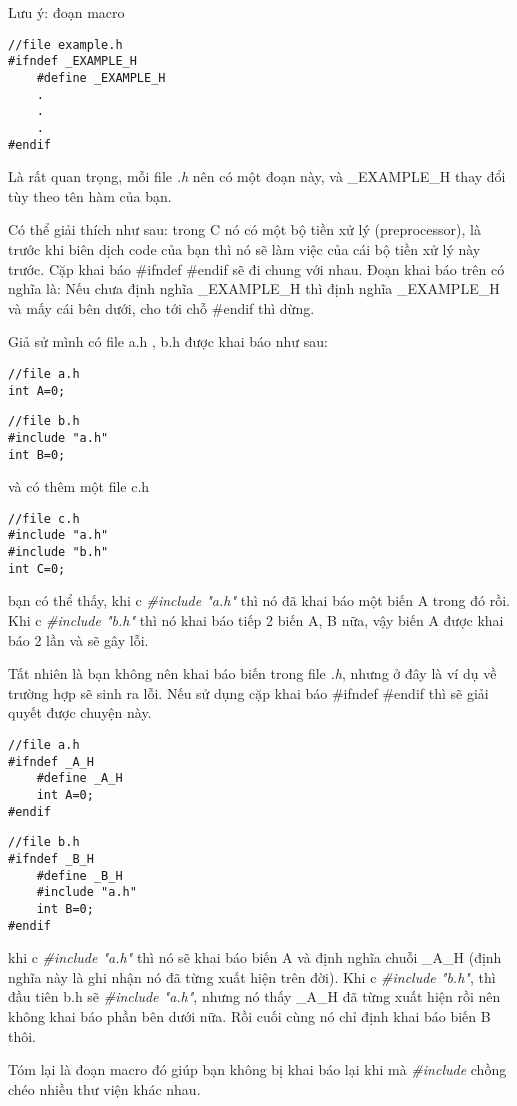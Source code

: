 Lưu ý: đoạn macro
\begin{lstlisting}
//file example.h
#ifndef _EXAMPLE_H
	#define _EXAMPLE_H
	.
	.
	.
#endif
\end{lstlisting}
Là rất quan trọng, mỗi file \textit{.h} nên có một đoạn này, và \_EXAMPLE\_H thay đổi tùy theo tên hàm của bạn.

Có thể giải thích như sau: trong C nó có một bộ tiền xử lý (preprocessor), là trước khi biên dịch code của bạn thì nó sẽ làm việc của cái bộ tiền xử lý này trước. Cặp khai báo \#ifndef \#endif sẽ đi chung với nhau. Đoạn khai báo trên có nghĩa là: Nếu chưa định nghĩa \_EXAMPLE\_H thì định nghĩa \_EXAMPLE\_H và mấy cái bên dưới, cho tới chỗ \#endif thì dừng.

Giả sử mình có file a.h , b.h được khai báo như sau:

\begin{lstlisting}
//file a.h
int A=0;
\end{lstlisting}
\begin{lstlisting}
//file b.h
#include "a.h"
int B=0;
\end{lstlisting}
và có thêm một file c.h
\begin{lstlisting}
//file c.h
#include "a.h"
#include "b.h"
int C=0;
\end{lstlisting}
bạn có thể thấy, khi c \textit{\#include "a.h"} thì nó đã khai báo một biến A trong đó rồi. Khi c \textit{\#include "b.h"} thì nó khai báo tiếp 2 biến A, B nữa, vậy biến A được khai báo 2 lần và sẽ gây lỗi.

Tất nhiên là bạn không nên khai báo biến trong file \textit{.h}, nhưng ở đây là ví dụ về trường hợp sẽ sinh ra lỗi. Nếu sử dụng cặp khai báo  \#ifndef \#endif thì sẽ giải quyết được chuyện này. 
\begin{lstlisting}
//file a.h
#ifndef _A_H
	#define _A_H
	int A=0;
#endif
\end{lstlisting}
\begin{lstlisting}
//file b.h
#ifndef _B_H
	#define _B_H
	#include "a.h"
	int B=0;
#endif
\end{lstlisting}

khi c \textit{\#include "a.h"} thì nó sẽ khai báo biến A và định nghĩa chuỗi \_A\_H (định nghĩa này là ghi nhận nó đã từng xuất hiện trên đời). Khi c \textit{\#include "b.h"}, thì đầu tiên b.h sẽ  \textit{\#include "a.h"}, nhưng nó thấy \_A\_H đã từng xuất hiện rồi nên không khai báo phần bên dưới nữa. Rồi cuối cùng nó chỉ định khai báo biến B thôi.

Tóm lại là đoạn macro đó giúp bạn không bị khai báo lại khi mà \textit{\#include} chồng chéo nhiều thư viện khác nhau.

